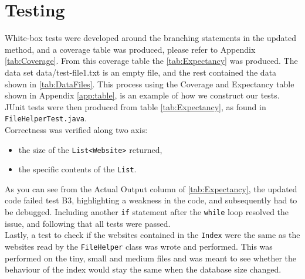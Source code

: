 \section{Testing}
White-box tests were developed around the branching statements in the updated method, and a coverage table was produced, please refer to Appendix \ref{tab:Coverage}. From this coverage table the \ref{tab:Expectancy} was produced. The data set data/test-file1.txt is an empty file, and the rest contained the data shown in \ref{tab:DataFiles}. This process using the Coverage and Expectancy table shown in Appendix \ref{app:table}, is an example of how we construct our tests.
JUnit tests were then produced from table \ref{tab:Expectancy}, as found in {\tt FileHelperTest.java}.\\ Correctness was verified along two axis:
\begin{itemize}
    \item the size of the {\tt List<Website>} returned,
    \item the specific contents of the {\tt List}.
\end{itemize}
As you can see from the Actual Output column of \ref{tab:Expectancy}, the updated code failed test B3, highlighting a weakness in the code, and subsequently had to be debugged. Including another {\tt if} statement after the {\tt while} loop resolved the issue, and following that all tests were passed.\\
Lastly, a test to check if the websites contained in the {\tt Index} were the same as the websites read by the {\tt FileHelper} class was wrote and performed. This was performed on the tiny, small and medium files and was meant to see whether the behaviour of the index would stay the same when the database size changed.